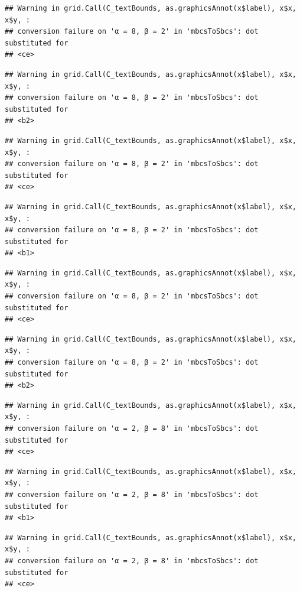 \documentclass[]{book}
\theoremstyle{definition}
\theoremstyle{definition}
\theoremstyle{definition}
\theoremstyle{remark}
\begin{document}
\begin{verbatim}
## Warning in grid.Call(C_textBounds, as.graphicsAnnot(x$label), x$x, x$y, :
## conversion failure on 'α = 8, β = 2' in 'mbcsToSbcs': dot substituted for
## <ce>
\end{verbatim}

\begin{verbatim}
## Warning in grid.Call(C_textBounds, as.graphicsAnnot(x$label), x$x, x$y, :
## conversion failure on 'α = 8, β = 2' in 'mbcsToSbcs': dot substituted for
## <b2>
\end{verbatim}

\begin{verbatim}
## Warning in grid.Call(C_textBounds, as.graphicsAnnot(x$label), x$x, x$y, :
## conversion failure on 'α = 8, β = 2' in 'mbcsToSbcs': dot substituted for
## <ce>
\end{verbatim}

\begin{verbatim}
## Warning in grid.Call(C_textBounds, as.graphicsAnnot(x$label), x$x, x$y, :
## conversion failure on 'α = 8, β = 2' in 'mbcsToSbcs': dot substituted for
## <b1>
\end{verbatim}

\begin{verbatim}
## Warning in grid.Call(C_textBounds, as.graphicsAnnot(x$label), x$x, x$y, :
## conversion failure on 'α = 8, β = 2' in 'mbcsToSbcs': dot substituted for
## <ce>
\end{verbatim}

\begin{verbatim}
## Warning in grid.Call(C_textBounds, as.graphicsAnnot(x$label), x$x, x$y, :
## conversion failure on 'α = 8, β = 2' in 'mbcsToSbcs': dot substituted for
## <b2>
\end{verbatim}

\begin{verbatim}
## Warning in grid.Call(C_textBounds, as.graphicsAnnot(x$label), x$x, x$y, :
## conversion failure on 'α = 2, β = 8' in 'mbcsToSbcs': dot substituted for
## <ce>
\end{verbatim}

\begin{verbatim}
## Warning in grid.Call(C_textBounds, as.graphicsAnnot(x$label), x$x, x$y, :
## conversion failure on 'α = 2, β = 8' in 'mbcsToSbcs': dot substituted for
## <b1>
\end{verbatim}

\begin{verbatim}
## Warning in grid.Call(C_textBounds, as.graphicsAnnot(x$label), x$x, x$y, :
## conversion failure on 'α = 2, β = 8' in 'mbcsToSbcs': dot substituted for
## <ce>
\end{verbatim}
\end{document}
